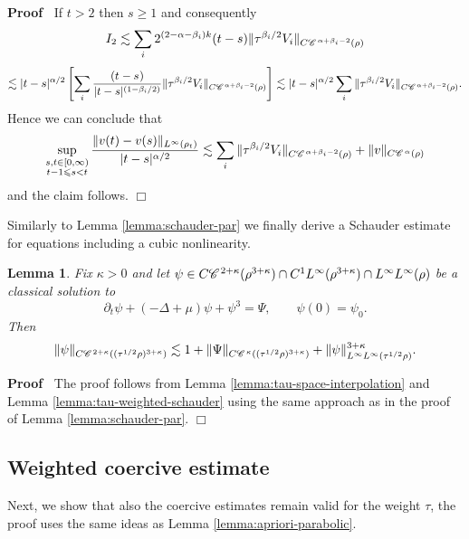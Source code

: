\documentclass[a4paper,11pt]{article}
\renewcommand{\leq}{\leqslant}
\renewcommand{\geq}{\geqslant}
\newenvironment{proof}{\noindent\textbf{Proof\ }}{\hspace*{\fill}$\Box$\medskip}
\newtheorem{lemma}[theorem]{Lemma}
\numberwithin{equation}{section}
\newcommand{\CC}{\mathscr{C} \hspace{.1em}}
\newcommand{\8}{\infty}
\begin{document}
\begin{proof}
  If $t>2$ then $s\geq 1$ and consequently
  \[ I_2 \lesssim \sum_i 2^{(2 - \alpha - \beta_i) k} (t - s) \| \tau^{\beta_i
     / 2} V_i \|_{C \CC^{\alpha + \beta_i - 2} (\rho)} \]
  \[ \lesssim | t - s |^{\alpha / 2} \left[ \sum_i \frac{(t^{} - s^{})}{| t -
     s |^{(1 - \beta_i / 2)}} \| \tau^{\beta_i / 2} V_i \|_{C \CC^{\alpha +
     \beta_i - 2} (\rho)} \right] \lesssim | t - s |^{\alpha / 2} \sum_i \|
     \tau^{\beta_i / 2} V_i \|_{C \CC^{\alpha + \beta_i - 2} (\rho)} . \]
Hence we can conclude that
  \[ \sup_{\substack{s,t\in [0,\8)\\t-1\leq s < t}} \frac{\|v (t) - v (s) \|_{L^{\infty} (\rho_{t})}}{| t - s
     |^{\alpha / 2}} \lesssim \sum_i \| \tau^{\beta_i / 2} V_i \|_{C
     \CC^{\alpha + \beta_i - 2} (\rho)} + \| v \|_{C \CC^{\alpha} (\rho)} \]
and the claim follows.
\end{proof}

Similarly to Lemma \ref{lemma:schauder-par} we finally  derive a Schauder estimate for equations including a cubic nonlinearity.

\begin{lemma}
  \label{lemma:schauder-par1}
Fix $\kappa > 0$ and let $\psi \in C\CC^{2 +
  \kappa} (\rho^{3 + \kappa}) \cap C^{1}L^{\infty} (\rho^{3+\kappa})\cap L^{\infty}L^{\infty}(\rho)$ be a classical solution
  to
  \[ \partial_{t}\psi+(- \Delta + \mu) \psi + \psi^3 = \Psi ,\qquad \psi(0)=\psi_{0}.\]
Then
  \[ \| \psi \|_{C\CC^{2 + \kappa} ((\tau^{1/2}\rho)^{3 + \kappa})} \lesssim  1+ \|
     \Psi \|_{C\CC^{\kappa} ((\tau^{1/2}\rho)^{3 + \kappa})} + \| \psi \|_{L^{\infty}L^{\infty}
     (\tau^{1/2}\rho)}^{3 + \kappa}. \]
\end{lemma}


\begin{proof}
The proof follows from Lemma \ref{lemma:tau-space-interpolation} and Lemma \ref{lemma:tau-weighted-schauder} using the same approach as in the proof of Lemma \ref{lemma:schauder-par}.
\end{proof}





\subsection{Weighted  coercive estimate}
\label{ss:d2}

Next, we show that also the coercive estimates remain valid for the weight $\tau$, the proof uses the same ideas as Lemma \ref{lemma:apriori-parabolic}.
\end{document}
